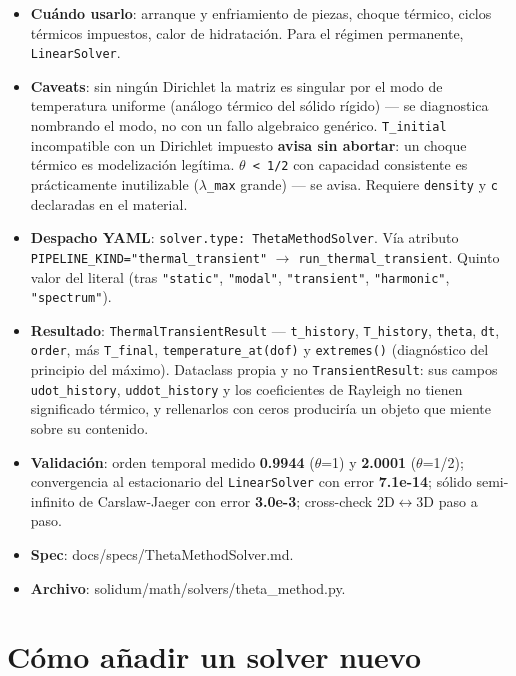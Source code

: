 \documentclass[11pt,letterpaper,oneside]{report}
\begin{document}
\begin{itemize}
  \item \textbf{Cuándo usarlo}: arranque y enfriamiento de piezas, choque térmico, ciclos térmicos impuestos, calor de hidratación. Para el régimen permanente, \texttt{LinearSolver}.
  \item \textbf{Caveats}: sin ningún Dirichlet la matriz es singular por el modo de temperatura uniforme (análogo térmico del sólido rígido) --- se diagnostica nombrando el modo, no con un fallo algebraico genérico. \texttt{T\_initial} incompatible con un Dirichlet impuesto \textbf{avisa sin abortar}: un choque térmico es modelización legítima. \texttt{\ensuremath{\theta} < 1/2} con capacidad consistente es prácticamente inutilizable (\texttt{\ensuremath{\lambda}\_max} grande) --- se avisa. Requiere \texttt{density} y \texttt{c} declaradas en el material.
  \item \textbf{Despacho YAML}: \texttt{solver.type: ThetaMethodSolver}. Vía atributo \texttt{PIPELINE\_KIND="thermal\_transient"} \ensuremath{\to} \texttt{run\_thermal\_transient}. Quinto valor del literal (tras \texttt{"static"}, \texttt{"modal"}, \texttt{"transient"}, \texttt{"harmonic"}, \texttt{"spectrum"}).
  \item \textbf{Resultado}: \texttt{ThermalTransientResult} --- \texttt{t\_history}, \texttt{T\_history}, \texttt{theta}, \texttt{dt}, \texttt{order}, más \texttt{T\_final}, \texttt{temperature\_at(dof)} y \texttt{extremes()} (diagnóstico del principio del máximo). Dataclass propia y no \texttt{TransientResult}: sus campos \texttt{udot\_history}, \texttt{uddot\_history} y los coeficientes de Rayleigh no tienen significado térmico, y rellenarlos con ceros produciría un objeto que miente sobre su contenido.
  \item \textbf{Validación}: orden temporal medido \textbf{0.9944} (\ensuremath{\theta}=1) y \textbf{2.0001} (\ensuremath{\theta}=1/2); convergencia al estacionario del \texttt{LinearSolver} con error \textbf{7.1e-14}; sólido semi-infinito de Carslaw-Jaeger con error \textbf{3.0e-3}; cross-check 2D\ensuremath{\leftrightarrow}3D paso a paso.
  \item \textbf{Spec}: docs/specs/ThetaMethodSolver.md.
  \item \textbf{Archivo}: solidum/math/solvers/theta\_method.py.
\end{itemize}


\section{Cómo añadir un solver nuevo}
\end{document}
